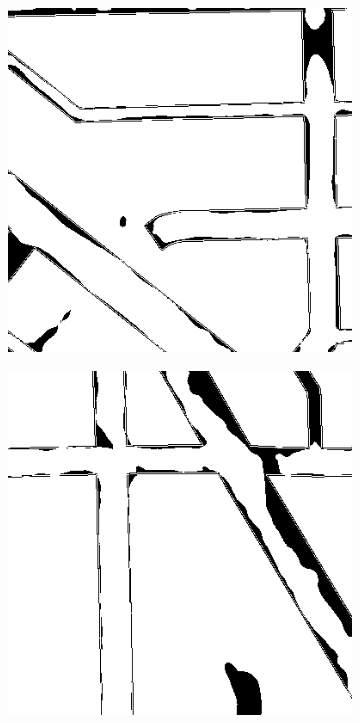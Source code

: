 \documentclass[10pt,conference,compsocconf]{IEEEtran}
\begin{document}
\begin{figure}
    \vspace{0.1cm}
    \begin{subfigure}[b]{0.3\columnwidth}
      \includegraphics[width=\columnwidth]{figures/training_hard/eval_orror_002.png}
    \end{subfigure}
    \begin{subfigure}[b]{0.3\columnwidth}
      \includegraphics[width=\columnwidth]{figures/training_hard/eval_orror_003.png}

\end{subfigure}
\end{figure}
\end{document}
